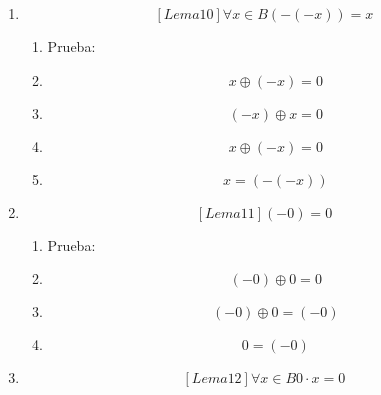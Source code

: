 \begin{enumerate}
\begin{enumerate}
\begin{enumerate}
\begin{enumerate}
        \begin{enumerate}
        \def\labelenumv{\arabic{enumv}.}
        \tightlist
        \item
          Prueba:
        \item
          \[z{: = y} \oplus \left( {- x} \right)\]
        \item
          \[z \oplus {x = \left( {y \oplus \left( {- x} \right)} \right)} \oplus x\]
        \item
          \[z \oplus {x = y} \oplus \left( {\left( {- x} \right) \oplus x} \right)\]
        \item
          \[z \oplus {x = y} \oplus 0\]
        \item
          \[z \oplus {x = y}\]
        \end{enumerate}
      \item
        \[\left\lbrack {{Lema}10} \right\rbrack\forall{x \in B}{\left( {- \left( {- x} \right)} \right) = x}\]

        \begin{enumerate}
        \def\labelenumv{\arabic{enumv}.}
        \tightlist
        \item
          Prueba:
        \item
          \[x \oplus {\left( {- x} \right) = 0}\]
        \item
          \[\left( {- x} \right) \oplus {x = 0}\]
        \item
          \[x \oplus {\left( {- x} \right) = 0}\]
        \item
          \[x = \left( {- \left( {- x} \right)} \right)\]
        \end{enumerate}
      \item
        \[\left\lbrack {{Lema}11} \right\rbrack{\left( {- 0} \right) = 0}\]

        \begin{enumerate}
        \def\labelenumv{\arabic{enumv}.}
        \tightlist
        \item
          Prueba:
        \item
          \[\left( {- 0} \right) \oplus {0 = 0}\]
        \item
          \[\left( {- 0} \right) \oplus {0 = \left( {- 0} \right)}\]
        \item
          \[0 = \left( {- 0} \right)\]
        \end{enumerate}
      \item
        \[\left\lbrack {{Lema}12} \right\rbrack\forall{x \in B}{{0 \cdot x} = 0}\]


\end{enumerate}
\end{enumerate}
\end{enumerate}
\end{enumerate}
